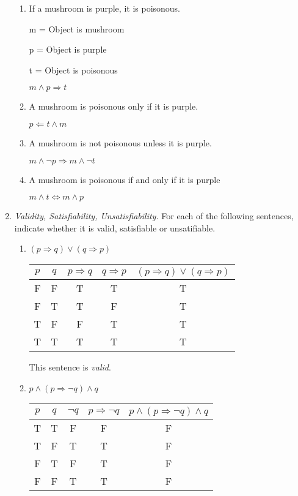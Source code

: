 \documentclass{article}
\begin{document}
\begin{enumerate}
	\begin{enumerate}
		\item If a mushroom is purple, it is poisonous.

			m = Object is mushroom

			p = Object is purple

			t = Object is poisonous

			$m \wedge  p \Rightarrow t$

		\item A mushroom is poisonous only if it is purple.

			$ p \Leftarrow t \wedge m$

		\item A mushroom is not poisonous unless it is purple.

			$m \wedge \neg p \Rightarrow m \wedge \neg t$
			
		\item A mushroom is poisonous if and only if it is purple
		
			$m \wedge t \Leftrightarrow m \wedge p$
			
	\end{enumerate}
	
	\item \emph{Validity, Satisfiability, Unsatisfiability.} For each of the following sentences, indicate
		whether it is valid, satisfiable or unsatifiable.
		
		\begin{enumerate}
			\item $( p \Rightarrow q) \vee (q \Rightarrow p)$
			
				\begin{tabular}{|c|c|c|c|c|}
					\hline
					$p$ & $q$ & $p \Rightarrow q$ & $q \Rightarrow p$ & $( p \Rightarrow q) \vee (q \Rightarrow p)$\\
					\hline
					F & F &  T & T & T\\
					\hline
					F & T & T & F & T\\
					\hline
					T & F & F & T & T\\
					\hline
					T & T & T & T & T\\
					\hline
				\end{tabular}
				
			This sentence is \emph{valid}.
			
			\item $p \wedge (p \Rightarrow \neg q) \wedge q$
			
				\begin{tabular}{|c|c|c|c|c|}
					\hline
					$p$ & $q$ & $\neg q$ & $p \Rightarrow \neg q$ & $p \wedge (p \Rightarrow \neg q) \wedge q$\\
					\hline
					T & T & F & F & F\\
					\hline
					T & F & T & T & F\\
					\hline
					F & T & F & T & F\\
					\hline
					F & F & T & T & F\\
					\hline
				\end{tabular}
				

\end{enumerate}
\end{enumerate}
\end{document}
